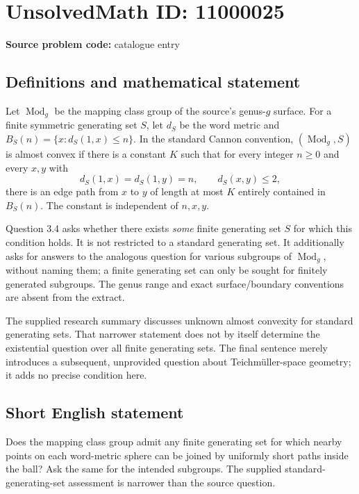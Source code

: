 \documentclass[11pt]{article}
\begin{document}
\section*{UnsolvedMath ID: 11000025}
\textbf{Source problem code:} catalogue entry
\subsection{Definitions and mathematical statement}
Let \(\operatorname{Mod}_g\) be the mapping class group of the source's genus-\(g\) surface. For a finite symmetric generating set \(S\), let \(d_S\) be the word metric and \(B_S(n)=\{x:d_S(1,x)\le n\}\). In the standard Cannon convention, \((\operatorname{Mod}_g,S)\) is almost convex if there is a constant \(K\) such that for every integer \(n\ge0\) and every \(x,y\) with
\[
 d_S(1,x)=d_S(1,y)=n,\qquad d_S(x,y)\le2,
\]
there is an edge path from \(x\) to \(y\) of length at most \(K\) entirely contained in \(B_S(n)\). The constant is independent of \(n,x,y\).

Question 3.4 asks whether there exists \emph{some} finite generating set \(S\) for which this condition holds. It is not restricted to a standard generating set. It additionally asks for answers to the analogous question for various subgroups of \(\operatorname{Mod}_g\), without naming them; a finite generating set can only be sought for finitely generated subgroups. The genus range and exact surface/boundary conventions are absent from the extract.

The supplied research summary discusses unknown almost convexity for standard generating sets. That narrower statement does not by itself determine the existential question over all finite generating sets. The final sentence merely introduces a subsequent, unprovided question about Teichmüller-space geometry; it adds no precise condition here.
\subsection{Short English statement}
Does the mapping class group admit any finite generating set for which nearby points on each word-metric sphere can be joined by uniformly short paths inside the ball? Ask the same for the intended subgroups. The supplied standard-generating-set assessment is narrower than the source question.
\end{document}
